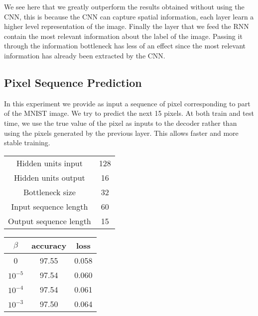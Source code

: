 \documentclass[11pt,oneside,openright]{report}
\begin{document}
We see here that we greatly outperform the results obtained without using the CNN, this is because the CNN can capture spatial information, each layer learn a higher level representation of the image. Finally the layer that we feed the RNN contain the most relevant information about the label of the image. Passing it through the information bottleneck has less of an effect since the most relevant information has already been extracted by the CNN.

\subsection{Pixel Sequence Prediction}
In this experiment we provide as input a sequence of pixel corresponding to part of the MNIST image. We try to predict the next 15 pixels. At both train and test time, we use the true value of the pixel as inputs to the decoder rather than using the pixels generated by the previous layer. This allows faster and more stable training.

\begin{minipage}{0.35\textwidth}
        \centering
\begin{tabular}{ c | c  }
 Hidden units input & 128 \\
 Hidden units output & 16 \\
 Bottleneck size & 32 \\
 Input sequence length & 60 \\
 Output sequence length & 15 \\
\end{tabular}
    \end{minipage}\hfill
    \begin{minipage}{0.8\textwidth}
        \centering
\begin{tabular}{ c | c c }
 $\beta$ & accuracy & loss \\
 \hline
0  &  97.55  & 0.058 \\
$10^{-5}$  & 97.54 & 0.060  \\
$10^{-4}$  & 97.54 & 0.061  \\
$10^{-3}$  & 97.50 & 0.064  \\
\end{tabular}
    \end{minipage}
    
    \begin{center}
\end{center}
\end{document}
